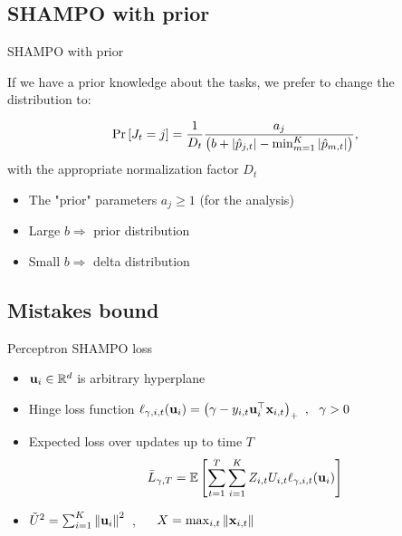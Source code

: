 \documentclass{beamer}
\begin{document}
\subsection{SHAMPO with prior}

 \begin{frame}{SHAMPO with prior}

 If we have a prior knowledge about the  tasks, we prefer  to change the distribution to:\newline

 \begin{equation*}
 {\rm Pr}\left[{J_t=j}\right] =
 \frac{1}{D_{t}}\frac{a_{j}}{\left({b+\left\vert{\hat{p}_{j,t}}\right\vert-\min_{m=1}^K\left\vert{\hat{p}_{m,t}}\right\vert}\right)}, \end{equation*}\newline
 with the appropriate normalization factor $D_t$\newline
 \begin{itemize}
 \item The "prior" parameters $a_j\ge1$ (for the analysis)\newline
 \item Large $b\Rightarrow$ prior distribution \newline
 \item Small $b\Rightarrow$ delta distribution\newline
 \end{itemize}
 \end{frame}


\subsection{Mistakes bound}
\begin{frame}{Perceptron SHAMPO  loss}
\begin{itemize}
\item $\mathbf{u}_i\in\mathbb{R}^d$ is arbitrary hyperplane \newline
\item Hinge loss function $\ell_{\gamma,i,t}(\mathbf{u}_{i})= \left({\gamma-y_{i,t}
  {\mathbf{u}}^{\top}_{i}\mathbf{x}_{i,t}}\right)_{+}~,~~\gamma>0$ \newline
\item Expected loss over updates up to time $T$
\begin{equation*}
 \bar{L}_{\gamma,T}=\mathbb{E}\brackets{\sum_{t=1}^T \sum_{i=1}^{K}{Z_{i,t}U_{i,t}\lossp{\gamma,i,t}(\vui{i})}}\newline
\end{equation*}
\item $\tilde{U}^2=\sum_{i=1}^{K}\left\Vert {\mathbf{u}_{i}} \right\Vert^2$~, ~~ $X=\max_{i,t}\Vert\mathbf{x}_{i,t}\Vert$
\end{itemize}
\end{frame}
\end{document}
